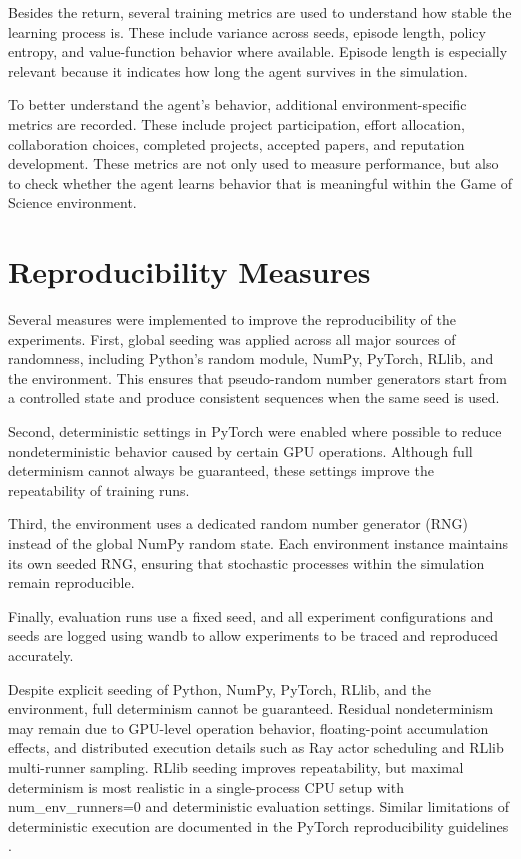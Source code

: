 \documentclass[english,bachelor]{hsluthesis}
\begin{document}
Besides the return, several training metrics are used to understand how stable the learning process is. These include variance across seeds, episode length, policy entropy, and value-function behavior where available. Episode length is especially relevant because it indicates how long the agent survives in the simulation.

To better understand the agent’s behavior, additional environment-specific metrics are recorded. These include project participation, effort allocation, collaboration choices, completed projects, accepted papers, and reputation development. These metrics are not only used to measure performance, but also to check whether the agent learns behavior that is meaningful within the Game of Science environment.

\section{Reproducibility Measures}

Several measures were implemented to improve the reproducibility of the experiments. First, global seeding was applied across all major sources of randomness, including Python’s random module, NumPy, PyTorch, RLlib, and the environment. This ensures that pseudo-random number generators start from a controlled state and produce consistent sequences when the same seed is used.

Second, deterministic settings in PyTorch were enabled where possible to reduce nondeterministic behavior caused by certain GPU operations. Although full determinism cannot always be guaranteed, these settings improve the repeatability of training runs.

Third, the environment uses a dedicated random number generator (RNG) instead of the global NumPy random state. Each environment instance maintains its own seeded RNG, ensuring that stochastic processes within the simulation remain reproducible.

Finally, evaluation runs use a fixed seed, and all experiment configurations and seeds are logged using \gls{wandb} to allow experiments to be traced and reproduced accurately.

Despite explicit seeding of Python, NumPy, PyTorch, RLlib, and the environment, full determinism cannot be guaranteed. Residual nondeterminism may remain due to GPU-level operation behavior, floating-point accumulation effects, and distributed execution details such as Ray actor scheduling and RLlib multi-runner sampling. RLlib seeding improves repeatability, but maximal determinism is most realistic in a single-process CPU setup with num\_env\_runners=0 and deterministic evaluation settings. Similar limitations of deterministic execution are documented in the PyTorch reproducibility guidelines \cite{pytorch_reproducibility}.
\end{document}
